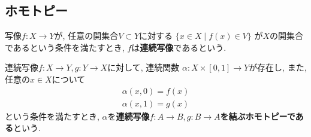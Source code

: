 \begin{comment}
************************************


\begin{Def}
集合$X$の部分集合族$\mathcal{O}$について, 次が成り立つとき$\mathcal{O}$を{\bf 集合$X$の位相}という.
\begin{enumerate}
\item $X\in\mathcal{O}$,$\emptyset\in\mathcal{O}$
\item 任意の$U,V\in\mathcal{O}$について$U\cap V\in\mathcal{O}$である.
\item ...
\end{enumerate}
\end{Def}

************************************
\end{comment}
\subsection{ホモトピー}
\begin{Def}
写像$f:X\rightarrow Y$が,
任意の開集合$V\subset Y$に対する
$
\{x\in X\mid f(x)\in V\}
$
が$X$の開集合であるという条件を満たすとき,
$f$は{\bf 連続写像}であるという.
\end{Def}
\begin{Def}
連続写像$f:X\rightarrow Y,g:Y\rightarrow X$に対して, 連続関数
$
\alpha : X\times [0,1]\rightarrow Y
$が存在し, また, 任意の$x\in X$について
\begin{align*}
\alpha(x,0)=f(x)\\
\alpha(x,1)=g(x)
\end{align*}
という条件を満たすとき,
$\alpha$を{\bf 連続写像$f:A\rightarrow B,g:B\rightarrow A$を結ぶホモトピーである}という.
\end{Def}


\begin{comment}
************************************
\begin{Def}
集合$X$に関して, 写像$d:X\times X\rightarrow \mathbb{R}$が以下の条件を満たすとき, {\bf $d$は$X$上の距離metricである}という.
\begin{enumerate}
\item 任意の$x,y\in X$について$d(x,y)=0\Leftrightarrow x=y$
\item 任意の$x,y\in X$について$d(x,y)=d(y,x)$
\item 任意の$x,y,z\in X$について$d(x,y)+d(y,z)\geq d(x,z)$
\end{enumerate}
\end{Def}
\begin{Def}
集合$X$と$X$上の距離$d$の組$(X,d)$を{\bf 距離空間 metric space}という
\end{Def}
\begin{Def}
集合$X$の部分集合$U\subset X$と$X$上の距離$d$について, 以下が成り立つとき, {\bf $U\subset X$は開集合である}という.

任意の$x\in U$に対して, とある実数$\epsilon > 0$が存在し, $d(x,y)<\epsilon$を満たす全ての$y\in X$が$y\in U$となる 
\end{Def}
************************************
\end{comment}